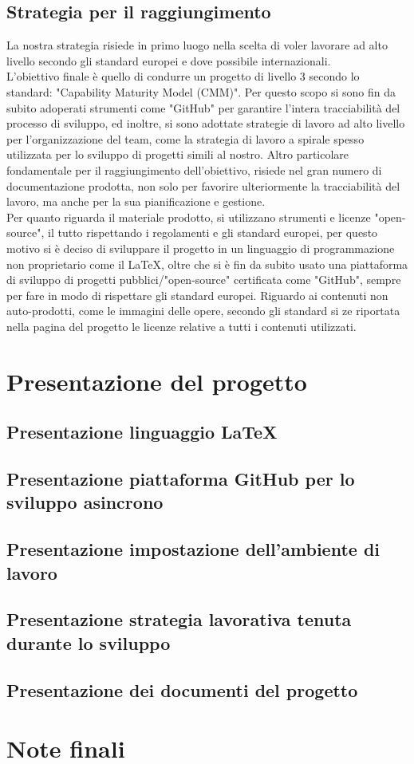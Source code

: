 \documentclass[hidelinks,12pt,a4paper]{article}
\begin{document}
\begin{flushleft}
			\subsection{Strategia per il raggiungimento}
			La nostra strategia risiede in primo luogo nella scelta di voler lavorare ad alto livello secondo gli standard europei e dove possibile internazionali.\\
			L'obiettivo finale è quello di condurre un progetto di livello 3 secondo lo standard: "Capability Maturity Model (CMM)". Per questo scopo si sono fin da subito adoperati strumenti come "GitHub" per garantire l'intera tracciabilità del processo di sviluppo, ed inoltre, si sono adottate strategie di lavoro ad alto livello per l'organizzazione del team, come la strategia di lavoro a spirale spesso utilizzata per lo sviluppo di progetti simili al nostro. Altro particolare fondamentale per il raggiungimento dell'obiettivo, risiede nel gran numero di documentazione prodotta, non solo per favorire ulteriormente la tracciabilità del lavoro, ma anche per la sua pianificazione e gestione.\\
			Per quanto riguarda il materiale prodotto, si utilizzano strumenti e licenze "open-source", il tutto rispettando i regolamenti e gli standard europei, per questo motivo si è deciso di sviluppare il progetto in un linguaggio di programmazione non proprietario come il \LaTeX, oltre che si è fin da subito usato una piattaforma di sviluppo di progetti pubblici/"open-source" certificata come "GitHub", sempre per fare in modo di rispettare gli standard europei. Riguardo ai contenuti non auto-prodotti, come le immagini delle opere, secondo gli standard si ze riportata nella pagina del progetto le licenze relative a tutti i contenuti utilizzati.
		
		\section{Presentazione del progetto}
			\subsection{Presentazione linguaggio \LaTeX}
			\subsection{Presentazione piattaforma GitHub per lo sviluppo asincrono}
			\subsection{Presentazione impostazione dell'ambiente di lavoro}
			\subsection{Presentazione strategia lavorativa tenuta durante lo sviluppo}
			\subsection{Presentazione dei documenti del progetto}
		
		\section{Note finali}
		
	\end{flushleft}
\end{document}
